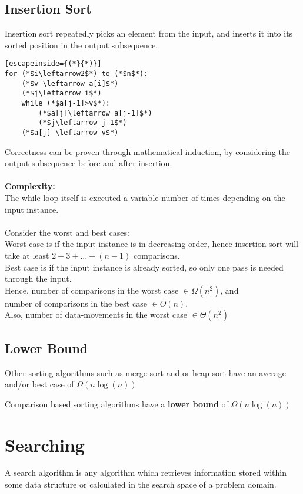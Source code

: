 \documentclass[a4paper]{article}
\begin{document}
\subsection{Insertion Sort}
Insertion sort repeatedly picks an element from the input, and inserts it into its sorted position in the output subsequence.
\begin{lstlisting}[escapeinside={(*}{*)}]
for (*$i\leftarrow2$*) to (*$n$*):
	(*$v \leftarrow a[i]$*)
	(*$j\leftarrow i$*)
	while (*$a[j-1]>v$*):
		(*$a[j]\leftarrow a[j-1]$*)
		(*$j\leftarrow j-1$*)
	(*$a[j] \leftarrow v$*)
\end{lstlisting}

Correctness can be proven through mathematical induction, by considering the output subsequence before and after insertion.\\ \\
\textbf{Complexity:}\\
The while-loop itself is executed a variable number of times depending on the input instance.\\ \\
Consider the worst and best cases:\\
Worst case is if the input instance is in decreasing order, hence insertion sort will take at least $2 + 3 +...+ (n-1)$ comparisons.\\
Best case is if the input instance is already sorted, so only one pass is needed through the input.\\
Hence,
number of comparisons in the worst case $\in \Omega(n^2)$, and\\
number of comparisons in the best case $\in O(n)$.\\
Also,
number of data-movements in the worst case $\in \Theta(n^2)$

\subsection{Lower Bound}
Other sorting algorithms such as merge-sort and or heap-sort have an average and/or best case of $\Omega(n \log(n))$

Comparison based sorting algorithms have a \textbf{lower bound} of $\Omega(n \log(n))$

\section{Searching}
A search algorithm is any algorithm which retrieves information stored within some data structure or calculated in the search space of a problem domain.
\end{document}
